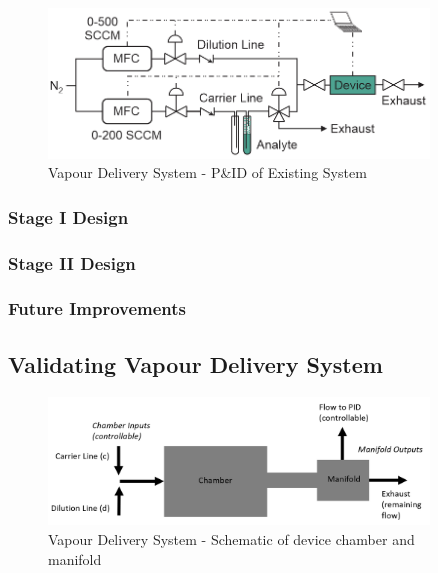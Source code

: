 \documentclass[
  letterpaper,
  DIV=11,
  numbers=noendperiod]{scrartcl}
\begin{document}
\begin{figure}

{\centering \includegraphics[width=0.9\textwidth,height=\textheight]{figures/ch5/PID_V0.png}

}

\caption{Vapour Delivery System - P\&ID of Existing System}

\end{figure}

\hypertarget{stage-i-design}{%
\subsubsection{Stage I Design}\label{stage-i-design}}

\hypertarget{stage-ii-design}{%
\subsubsection{Stage II Design}\label{stage-ii-design}}

\hypertarget{future-improvements}{%
\subsubsection{Future Improvements}\label{future-improvements}}

\hypertarget{validating-vapour-delivery-system}{%
\subsection{Validating Vapour Delivery
System}\label{validating-vapour-delivery-system}}

\begin{figure}

{\centering \includegraphics[width=0.9\textwidth,height=\textheight]{figures/ch5/chamber-manifold.png}

}

\caption{Vapour Delivery System - Schematic of device chamber and
manifold}

\end{figure}
\end{document}

